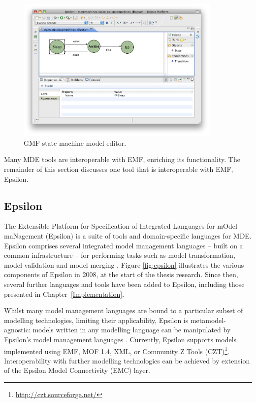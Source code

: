 \begin{figure}[htbp]
  \begin{center}
    \leavevmode
    \includegraphics[width=10cm]{2.Background/images/gmf_model_editor.png}
  \end{center}
  \caption{GMF state machine model editor.}
  \label{fig:gmf_model_editor}
\end{figure}

Many MDE tools are interoperable with EMF, enriching its functionality. The remainder of this section discusses one tool that is interoperable with EMF, Epsilon.

\subsection{Epsilon}
\label{subsec:epsilon}
The Extensible Platform for Specification of Integrated Languages for mOdel maNagement (Epsilon) \cite{kolovos09thesis} is a suite of tools and domain-specific languages for MDE. Epsilon comprises several integrated model management languages -- built on  a common infrastructure -- for performing tasks such as model transformation, model validation and model merging \cite{kolovos09thesis}. Figure \ref{fig:epsilon} illustrates the various components of Epsilon in 2008, at the start of the thesis research. Since then, several further languages and tools have been added to Epsilon, including those presented in Chapter~\ref{Implementation}.

Whilst many model management languages are bound to a particular subset of modelling technologies, limiting their applicability, Epsilon is metamodel-agnostic: models written in any modelling language can be manipulated by Epsilon's model management languages \cite{kolovos06eol}. Currently, Epsilon supports models implemented using EMF, MOF 1.4, XML, or Community Z Tools (CZT)\footnote{\url{http://czt.sourceforge.net/}}. Interoperability with further modelling technologies can be achieved by extension of the Epsilon Model Connectivity (EMC) layer. 

